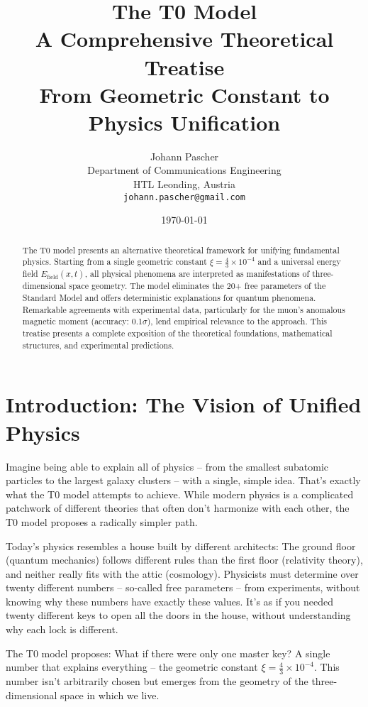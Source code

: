 \documentclass[12pt,a4paper]{article}
\title{{\Huge \color{t0blue}The T0 Model}\\
	{\LARGE A Comprehensive Theoretical Treatise}\\
	\vspace{1cm}
	{\Large From Geometric Constant to Physics Unification}}
\author{{\Large Johann Pascher}\\
	Department of Communications Engineering\\
	HTL Leonding, Austria\\
	\texttt{johann.pascher@gmail.com}}
\date{\today}
\newcommand{\xipar}{\ensuremath{\xi}}
\newcommand{\Efield}{E_\text{field}}
\begin{document}
	
	\maketitle
	
	\begin{abstract}
		\noindent The T0 model presents an alternative theoretical framework for unifying fundamental physics. Starting from a single geometric constant $\xipar = \frac{4}{3} \times 10^{-4}$ and a universal energy field $\Efield(x,t)$, all physical phenomena are interpreted as manifestations of three-dimensional space geometry. The model eliminates the 20+ free parameters of the Standard Model and offers deterministic explanations for quantum phenomena. Remarkable agreements with experimental data, particularly for the muon's anomalous magnetic moment (accuracy: 0.1$\sigma$), lend empirical relevance to the approach. This treatise presents a complete exposition of the theoretical foundations, mathematical structures, and experimental predictions.
	\end{abstract}
	
	\tableofcontents
	\newpage
	
	\section{Introduction: The Vision of Unified Physics}
	
	Imagine being able to explain all of physics -- from the smallest subatomic particles to the largest galaxy clusters -- with a single, simple idea. That's exactly what the T0 model attempts to achieve. While modern physics is a complicated patchwork of different theories that often don't harmonize with each other, the T0 model proposes a radically simpler path.
	
	Today's physics resembles a house built by different architects: The ground floor (quantum mechanics) follows different rules than the first floor (relativity theory), and neither really fits with the attic (cosmology). Physicists must determine over twenty different numbers -- so-called free parameters -- from experiments, without knowing why these numbers have exactly these values. It's as if you needed twenty different keys to open all the doors in the house, without understanding why each lock is different.
	
	\begin{revolutionary}
		The T0 model proposes: What if there were only one master key? A single number that explains everything -- the geometric constant $\xipar = \frac{4}{3} \times 10^{-4}$. This number isn't arbitrarily chosen but emerges from the geometry of the three-dimensional space in which we live.
	\end{revolutionary}
	
\end{document}
